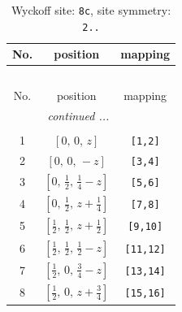 \documentclass[fleqn,8pt]{jsarticle}
\begin{document}
\renewcommand{\arraystretch}{1.2}
\begin{longtable}{ccc}
\caption{Wyckoff site: {\tt 8c}, site symmetry: {\tt 2..}}
 \\
 \hline \hline
No. & position & mapping \\ \hline \endfirsthead

\multicolumn{2}{l}{\tablename\ \thetable{}} \\
 \hline \hline
No. & position & mapping \\ \hline \endhead

 \hline \hline
\multicolumn{2}{r}{\footnotesize\it continued ...} \\ \endfoot

 \hline \hline
\multicolumn{2}{r}{} \\ \endlastfoot

1 & $\left[ 0,\, 0,\, z \right]$ & {\tt [1,2]} \\ \hline
2 & $\left[ 0,\, 0,\, - z \right]$ & {\tt [3,4]} \\ \hline
3 & $\left[ 0,\, \frac{1}{2},\, \frac{1}{4} - z \right]$ & {\tt [5,6]} \\ \hline
4 & $\left[ 0,\, \frac{1}{2},\, z + \frac{1}{4} \right]$ & {\tt [7,8]} \\ \hline
5 & $\left[ \frac{1}{2},\, \frac{1}{2},\, z + \frac{1}{2} \right]$ & {\tt [9,10]} \\ \hline
6 & $\left[ \frac{1}{2},\, \frac{1}{2},\, \frac{1}{2} - z \right]$ & {\tt [11,12]} \\ \hline
7 & $\left[ \frac{1}{2},\, 0,\, \frac{3}{4} - z \right]$ & {\tt [13,14]} \\ \hline
8 & $\left[ \frac{1}{2},\, 0,\, z + \frac{3}{4} \right]$ & {\tt [15,16]} \\
\end{longtable}
\renewcommand{\arraystretch}{1.2}
\end{document}

